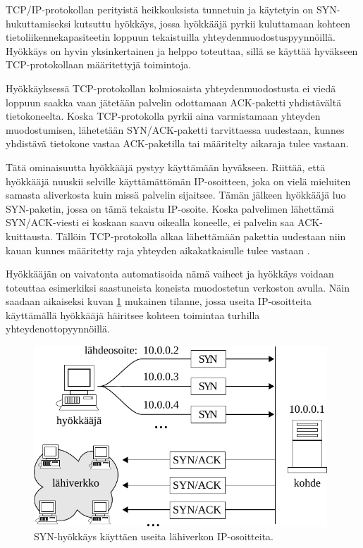 TCP/IP-protokollan perityistä heikkouksista tunnetuin ja
käytetyin on SYN-hu\-kut\-ta\-mi\-sek\-si kutsuttu hyökkäys, jossa hyökkääjä
pyrkii kuluttamaan kohteen tietoliikennekapasiteetin loppuun
tekaistuilla yhteydenmuodostuspyynnöillä. Hyökkäys on hyvin
yksinkertainen ja helppo toteuttaa, sillä se käyttää hyväkseen
TCP-protokollaan määritettyjä toimintoja. 

Hyökkäyksessä TCP-protokollan kolmiosaista yhteydenmuodostusta ei viedä loppuun
saakka vaan jätetään palvelin odottamaan ACK-paketti yhdistävältä
tietokoneelta. Koska TCP-protokolla pyrkii aina varmistamaan yhteyden muodostumisen,
lähetetään SYN/ACK-paketti tarvittaessa uudestaan, kunnes yhdistävä
tietokone vastaa ACK-paketilla tai määritelty aikaraja tulee
vastaan. 

Tätä ominaisuutta hyökkääjä pystyy käyttämään
hyväkseen. Riittää, että hyökkääjä nuuskii selville käyttämättömän
IP-osoitteen, joka on vielä mieluiten samasta aliverkosta kuin missä
palvelin sijaitsee. Tämän jälkeen hyökkääjä luo SYN-paketin, jossa on
tämä tekaistu IP-osoite. Koska palvelimen lähettämä SYN/ACK-viesti ei
koskaan saavu oikealla koneelle, ei palvelin saa ACK-kuittausta. Tällöin
TCP-pro\-to\-kol\-la alkaa lähettämään pakettia uudestaan niin kauan
kunnes määritetty raja yhteyden aikakatkaisulle tulee vastaan
\cite{STACK}. 

Hyökkääjän on vaivatonta automatisoida nämä vaiheet ja
hyökkäys voidaan toteuttaa esimerkiksi saastuneista koneista
muodostetun verkoston avulla. Näin saadaan aikaiseksi kuvan \ref{syn}
mukainen tilanne, jossa useita IP-osoitteita käyttämällä hyökkääjä
häiritsee kohteen toimintaa turhilla yhteydenottopyynnöillä.

\begin{figure}[h]
\centering
\includegraphics[width=11cm]{pics/syn.pdf}
\caption{SYN-hyökkäys käyttäen useita lähiverkon IP-osoitteita.}
\label{syn}
\end{figure}

